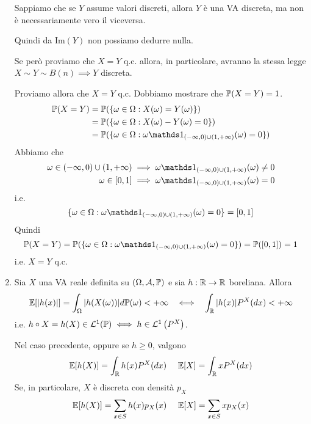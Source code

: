 \begin{enumerate}
\begin{oss}
Sappiamo che se $Y$ assume valori discreti, allora $Y$ è una VA discreta, ma non è necessariamente vero il viceversa.
\end{oss}

Quindi da $\mathrm{Im}(Y)$ non possiamo dedurre nulla.

Se però proviamo che $X=Y$ q.c. allora, in particolare, avranno la stessa legge $X\sim Y\sim B(n) \implies Y$ discreta.

Proviamo allora che $X=Y$ q.c. Dobbiamo mostrare che $\mathbb{P}(X=Y) =1$.
\begin{align*}
\PP(X=Y) & =\PP(\{\omega \in \Omega :X(\omega) =Y(\omega)\})\\
 & =\PP(\{\omega \in \Omega :X(\omega) -Y(\omega) =0\})\\
 & =\PP(\{\omega \in \Omega :\omega \Ind_{(-\infty ,0) \cup (1,+\infty)}(\omega) =0\})
\end{align*}
Abbiamo che
\begin{align*}
\omega \in (-\infty ,0) \cup (1,+\infty) & \implies \omega \Ind_{(-\infty ,0) \cup (1,+\infty)}(\omega) \neq 0\\
\omega \in [0,1] & \implies \omega \Ind_{(-\infty ,0) \cup (1,+\infty)}(\omega) =0
\end{align*}
i.e.
\begin{equation*}
\{\omega \in \Omega :\omega \Ind_{(-\infty ,0) \cup (1,+\infty)}(\omega) =0\} =[0,1]
\end{equation*}
Quindi
\begin{equation*}
\PP(X=Y) =\PP(\{\omega \in \Omega :\omega \Ind_{(-\infty ,0) \cup (1,+\infty)}(\omega) =0\}) =\PP([0,1]) =1
\end{equation*}
i.e. $X=Y$ q.c.
\item
\begin{theorem}
Sia $X$ una VA reale definita su $(\Omega,\mathcal{A},\mathbb{P})$ e sia $h:\mathbb{R}\rightarrow \mathbb{R}$ boreliana. Allora
\begin{equation*}
\mathbb{E}[|h(x)|] =\int_{\Omega }| h(X(\omega))| d\mathbb{P}(\omega) < +\infty \ \ \iff \ \ \int_{\mathbb{R}}| h(x)| P^{X}(dx) < +\infty 
\end{equation*}
i.e. $h\circ X=h(X) \in \mathcal{L}^{1}(\mathbb{P}) \iff h\in \mathcal{L}^{1}\left(P^{X}\right)$.

Nel caso precedente, oppure se $h\geq 0$, valgono
\begin{equation*}
\mathbb{E}[h(X)] =\int_{\mathbb{R}} h(x) P^{X}(dx) \ \ \ \ \mathbb{E}[X] =\int_{\mathbb{R}} xP^{X}(dx)
\end{equation*}
Se, in particolare, $X$ è discreta con densità $p_{X}$
\begin{equation*}
\mathbb{E}[h(X)] =\sum\limits_{x\in S} h(x) p_{X}(x) \ \ \ \ \mathbb{E}[X] =\sum\limits_{x\in S} xp_{X}(x)
\end{equation*}
\end{theorem}


\end{enumerate}

